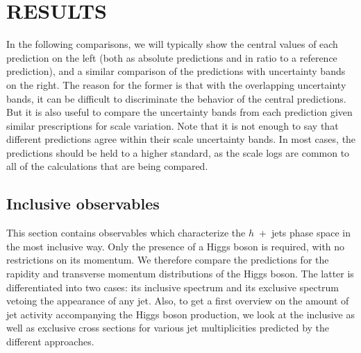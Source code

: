 \section{RESULTS}
\label{sec:hjetscomp:results}

In the following comparisons, we will typically show the central
values of each prediction on the left (both as absolute predictions
and in ratio to a reference prediction), and a similar comparison of
the predictions with uncertainty bands on the right. The reason for
the former is that with the overlapping uncertainty bands, it can be
difficult to discriminate the behavior of the central predictions. But
it is also useful to compare the uncertainty bands from each
prediction given similar prescriptions for scale variation.  Note that
it is not enough to say that different predictions agree within their
scale uncertainty bands. In most cases, the predictions should be held
to a higher standard, as the scale logs are common to all of the
calculations that are being compared.

\Rivet \cite{Buckley:2010ar}








\subsection{Inclusive observables}
\label{sec:hjetscomp:results:inclobs}

This section contains observables which characterize the
$h$~+~jets phase space in the most inclusive way. Only the presence 
of a Higgs boson is required, with no restrictions on its momentum. 
We therefore compare 
the predictions for the rapidity and transverse momentum distributions 
of the Higgs boson. The latter is differentiated into two cases: its 
inclusive spectrum and its exclusive spectrum vetoing the appearance 
of any jet. Also, to get a first overview on the amount of jet activity 
accompanying the Higgs boson production, we look at the inclusive as 
well as exclusive cross sections for various jet multiplicities predicted by the different 
approaches.

